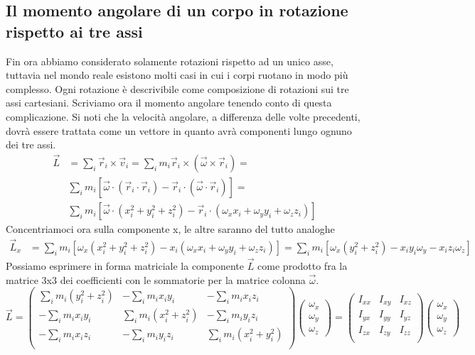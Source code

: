 \documentclass[10pt,a4paper]{article}
\begin{document}
\subsection{Il momento angolare di un corpo in rotazione rispetto ai tre assi}
Fin ora abbiamo considerato solamente rotazioni rispetto ad un unico asse, tuttavia nel mondo reale esistono molti casi in cui i corpi ruotano in modo più complesso. Ogni rotazione è descrivibile come composizione di rotazioni sui tre assi cartesiani. Scriviamo ora il momento angolare tenendo conto di questa complicazione. Si noti che la velocità angolare, a differenza delle volte precedenti, dovrà essere trattata come un vettore in quanto avrà componenti lungo ognuno dei tre assi.  
\begin{align*}
\vec{L} &= \sum_i \vec{r}_i \times \vec{v}_i = \sum_i m_i \vec{r}_i \times (\vec{\omega} \times \vec{r}_i) =\\
&\sum_i m_i[\vec{\omega}\cdot(\vec{r}_i\cdot \vec{r}_i)-\vec{r}_i\cdot(\vec{\omega} \cdot \vec{r}_i)] =\\
&\sum_i m_i[\vec{\omega}\cdot(x_i^2+y_i^2+z_i^2)-\vec{r}_i\cdot(\omega_x x_i+\omega_y y_i+\omega_z z_i)]
\end{align*}
Concentriamoci ora sulla componente x, le altre saranno del tutto analoghe
\begin{align*}
	\vec{L}_x &= \sum_i m_i[\omega_x(x_i^2+y_i^2+z_i^2)-x_i(\omega_x x_i+\omega_y y_i+\omega_z z_i)]= \sum_i m_i [\omega_x(y_i^2+z_i^2)-x_i y_i \omega_y-x_i z_i \omega_z]
\end{align*}
Possiamo esprimere in forma matriciale la componente $\vec{L}$ come prodotto fra la matrice 3x3 dei coefficienti con le sommatorie per la matrice colonna $\vec{\omega}$. 
\[ \vec{L} =
\begin{pmatrix}
	\sum_i m_i (y_i^2+z_i^2) & -\sum_i m_i x_i y_i        & -\sum_i m_i x_i z_i\\
	-\sum_i m_i x_i y_i      &  \sum_i m_i (x_i^2+ z_i^2) & -\sum_i m_i y_i z_i\\
	-\sum_i m_i x_i z_i      & -\sum_i m_i y_i z_i        & \sum_i m_i (x_i^2 + y_i^2)\\
\end{pmatrix}
\begin{pmatrix}
	\omega_x \\
	\omega_y \\
	\omega_z
\end{pmatrix}
= 
\begin{pmatrix}
	I_{xx} & I_{xy} & I_{xz}\\
	I_{yx} & I_{yy} & I_{yz}\\
	I_{zx} & I_{zy} & I_{zz}\\
\end{pmatrix}
\begin{pmatrix}
	\omega_x \\
	\omega_y \\
	\omega_z
\end{pmatrix}
\]
\end{document}
